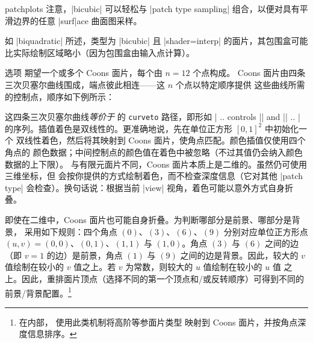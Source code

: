 {\begin{pgfplotslibrary}{patchplots}
注意，|bicubic| 可以轻松与 |patch type sampling| 组合，以便对具有平滑边界的任意
|surf|ace 曲面图采样。

如 |biquadratic| 所述，类型为 |bicubic| 且 |shader=interp| 的面片，其包围盒可能
比实际绘制区域略小（因为包围盒由输入点计算）。

选项  期望一个或多个 Coons 面片，每个由 $n=12$ 个点构成。
Coons 面片由四条三次贝塞尔曲线围成，端点彼此相连——这 $n$ 个点以特定顺序提供
这些曲线所需的控制点，顺序如下例所示：
%
\begin{codeexample}[]
\end{codeexample}
%
\noindent 这四条三次贝塞尔曲线\emph{等价于} \pgfname{} 的 \texttt{curveto}
路径，即形如
| .. controls || and || .. |
的序列。插值着色是双线性的。更准确地说，先在单位正方形 $[0,1]^2$ 中初始化一个
双线性着色，然后将其映射到 Coons 面片，使角点匹配。颜色插值仅使用四个角点的
颜色数据；中间控制点的颜色值在着色中被忽略（不过其值仍会纳入颜色数据的上下限）。
与有限元面片不同，Coons 面片本质上是二维的。虽然仍可使用三维坐标，但
\PGFPlots{} 会按你提供的方式绘制着色，而不检查深度信息（它对其他 |patch type|
会检查）。换句话说：根据当前 |view| 视角，着色可能以意外方式自身折叠。

即使在二维中，Coons 面片也可能自身折叠。为判断哪部分是前景、哪部分是背景，
采用如下规则：四个角点 $(0)$、$(3)$、$(6)$、$(9)$ 分别对应单位正方形点
$(u,v)=(0,0)$、$(0,1)$、$(1,1)$ 与 $(1,0)$。角点 $(3)$ 与 $(6)$ 之间的边
（即 $v=1$ 的边）是前景，角点 $(1)$ 与 $(9)$ 之间的边是背景。因此，较大的 $v$
值绘制在较小的 $v$ 值之上。若 $v$ 为常数，则较大的 $u$ 值绘制在较小的 $u$ 值
之上。因此，重排面片顶点（选择不同的第一个顶点和/或反转顺序）可得到不同的
前景/背景配置。\footnote{在内部，\PGFPlots{} 使用此类机制将高阶等参面片类型
映射到 Coons 面片，并按角点深度信息排序。}


\end{pgfplotslibrary}}
